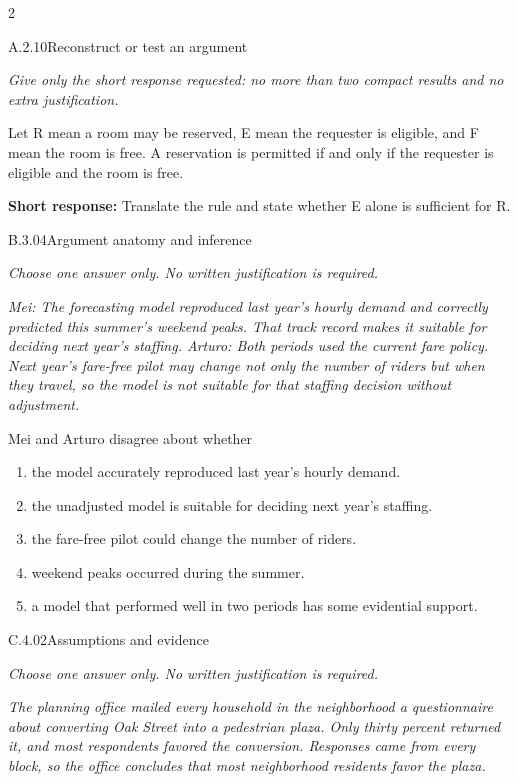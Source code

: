 \documentclass[9pt]{extarticle}
\newcommand{\choice}[1]{\item #1}
\begin{document}
\begin{multicols}{2}
\begin{DenseCoreProblem}{A.2.10}{Reconstruct or test an argument}
{\scriptsize\textit{Give only the short response requested: no more than two compact results and no extra justification.}\par}
Let R mean a room may be reserved, E mean the requester is eligible, and F mean the room is free. A reservation is permitted if and only if the requester is eligible and the room is free.

\textbf{Short response:} Translate the rule and state whether E alone is sufficient for R.
\end{DenseCoreProblem}
\begin{DenseCoreProblem}{B.3.04}{Argument anatomy and inference}
{\scriptsize\textit{Choose one answer only. No written justification is required.}\par}
\emph{Mei: The forecasting model reproduced last year's hourly demand and correctly predicted this summer's weekend peaks. That track record makes it suitable for deciding next year's staffing. Arturo: Both periods used the current fare policy. Next year's fare-free pilot may change not only the number of riders but when they travel, so the model is not suitable for that staffing decision without adjustment.}

Mei and Arturo disagree about whether
\begin{enumerate}[label=(\alph*)]
  \choice{the model accurately reproduced last year's hourly demand.}
  \choice{the unadjusted model is suitable for deciding next year's staffing.}
  \choice{the fare-free pilot could change the number of riders.}
  \choice{weekend peaks occurred during the summer.}
  \choice{a model that performed well in two periods has some evidential support.}
\end{enumerate}
\end{DenseCoreProblem}
\columnbreak
\begin{DenseCoreProblem}{C.4.02}{Assumptions and evidence}
{\scriptsize\textit{Choose one answer only. No written justification is required.}\par}
\emph{The planning office mailed every household in the neighborhood a questionnaire about converting Oak Street into a pedestrian plaza. Only thirty percent returned it, and most respondents favored the conversion. Responses came from every block, so the office concludes that most neighborhood residents favor the plaza.}


\end{DenseCoreProblem}
\end{multicols}
\end{document}
